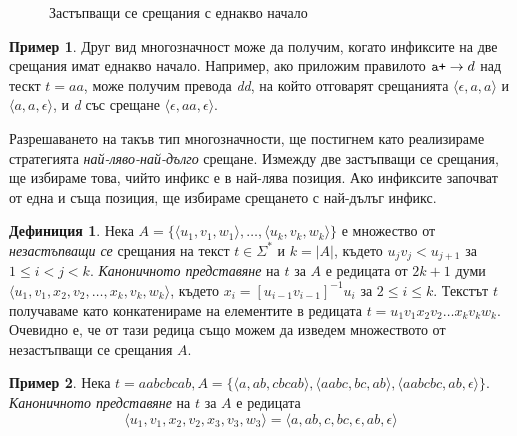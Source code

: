 \documentclass[12pt, oneside]{article}
\theoremstyle{definition}
\newtheorem{definition}{Дефиниция}[section]
\newtheorem{example}{Пример}[section]
\begin{document}
\begin{figure}[!htb]
	\centering
	
	\caption{Застъпващи се срещания с еднакво начало}
\end{figure}

\begin{example}
	Друг вид многозначност може да получим, когато инфиксите на две срещания имат еднакво начало. Например, ако приложим правилото \( \verb/a+/ \to d \) над тескт \( t = aa \), може получим превода \emph{dd}, на който отговарят срещанията \( \langle \epsilon, a, a \rangle \) и \( \langle a, a, \epsilon \rangle \), и \emph{d} със срещане \( \langle \epsilon, aa, \epsilon \rangle \).
\end{example}

Разрешаването на такъв тип многозначности, ще постигнем като реализираме стратегията \emph{най-ляво-най-дълго} срещане. Измежду две застъпващи се срещания, ще избираме това, чийто инфикс е в най-лява позиция. Ако инфиксите започват от една и съща позиция, ще избираме срещането с най-дълъг инфикс.

\begin{definition}
	Нека \(A = \{ \langle u_1, v_1, w_1 \rangle, \dots , \langle u_k, v_k, w_k \rangle \}\) е множество от \emph{незастъпващи се} срещания на текст \(t \in \Sigma^*\) и \(k = |A|\), където \( u_jv_j < u_{j+1} \) за \( 1 \le i < j < k \). \emph{Каноничното представяне} на \(t\) за \(A\) е редицата от \(2k+1\) думи \( \langle u_1, v_1, x_2, v_2, \dots , x_k, v_k, w_k \rangle \), където \( x_i = [u_{i-1}v_{i-1}]^{-1}u_i \) за \( 2 \le i \le k \). Текстът \(t\) получаваме като конкатенираме на елементите в редицата \(t = u_1v_1x_2v_2 \dots x_kv_kw_k \). Очевидно е, че от тази редица също можем да изведем множеството от незастъпващи се срещания \(A\).
\end{definition}

\begin{example}
	Нека \( t = aabcbcab, A = \{ \langle a, ab, cbcab \rangle, \langle aabc, bc, ab \rangle, \langle aabcbc, ab, \epsilon \rangle \} \). \emph{Каноничното представяне} на \(t\) за \(A\) е редицата
	\[ \langle u_1, v_1, x_2, v_2, x_3, v_3, w_3 \rangle = \langle a, ab, c, bc, \epsilon, ab, \epsilon \rangle \]
\end{example}
\end{document}
